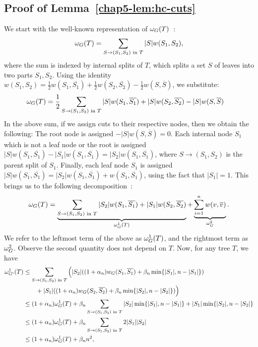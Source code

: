 \subsection{Proof of Lemma~\ref{chap5-lem:hc-cuts}}\label{chap5-app:hc-cuts}
    We start with the well-known representation of $\omega_G(T)$~\citep{dasgupta2016cost}:
    \[
        \omega_G(T) = \sum_{S \rightarrow (S_1, S_2) \text{ in $T$}} |S|w(S_1, S_2),
    \]
    where the sum is indexed by internal splits of $T$, which splits a set $S$ of leaves into two parts $S_1, S_2$. Using the identity $w(S_1, S_2) = \frac{1}{2}w(S_1, \overline{S_1}) + \frac{1}{2}w(S_2, \overline{S_2}) - \frac{1}{2}w(S, \overline{S})$, we substitute:
    \begin{align*}
        \omega_G(T) &= \frac{1}{2}\sum_{S \rightarrow (S_1, S_2) \text{ in $T$}} |S|w(S_1, \overline{S_1}) + |S|w(S_2, \overline{S_2}) - |S|w(S, \overline{S})
    \end{align*}
    In the above sum, if we assign cuts to their respective nodes, then we obtain the following: The root node is assigned $-|S|w(S, \overline{S}) = 0$. Each internal node $S_1$ which is not a leaf node or the root is assigned $|S|w(S_1, \overline{S_1}) - |S_1|w(S_1, \overline{S_1}) = |S_2| w(S_1, \overline{S_1})$, where $S \rightarrow (S_1, S_2)$ is the parent split of $S_1$. Finally, each leaf node $S_1$ is assigned $|S|w(S_1, \overline{S_1}) = |S_2|w(S_1, \overline{S_1}) + w(S_1, \overline{S_1})$, using the fact that $|S_1| = 1$. This brings us to the following decomposition~\citep{agarwal2022sublinear}:
    \[
        \omega_G(T) = \underbrace{\sum_{S \rightarrow (S_1, S_2) \text{ in $T$}}|S_2| w(S_1, \overline{S_1}) + |S_1| w(S_2, \overline{S_2})}_{\omega_G^1(T)} + \underbrace{\sum_{i = 1}^n w(v, \overline{v})}_{\omega_G^2}.
    \]
    We refer to the leftmost term of the above as $\omega_G^1(T)$, and the rightmost term as $\omega_G^2$. Observe the second quantity does not depend on $T$. Now, for any tree $T$, we have
    \begin{align*}
        \omega_{G'}^1(T) &\leq \sum_{S \rightarrow (S_1, S_2) \text{ in $T$}}\Big( |S_2| ((1+\alpha_n)w_{G}(S_1, \overline{S_1}) + \beta_n \min\{|S_1|, n - |S_1|\}) \\ &\qquad + |S_1| ((1+\alpha_n )w_{G}(S_2, \overline{S_2}) + \beta_n \min\{|S_2|, n - |S_2|\})\Big) \\
        &\leq (1+\alpha_n)\omega_{G}^1(T) + \beta_n \sum_{S \rightarrow (S_1, S_2) \text{ in $T$}} |S_2| \min\{|S_1|, n - |S_1|\} + |S_1| \min\{|S_2|, n - |S_2|\} \\
        &\leq (1+\alpha_n)\omega_{G}^1(T) + \beta_n \sum_{S \rightarrow (S_1, S_2) \text{ in $T$}} 2|S_1| |S_2| \\
        &\leq (1+\alpha_n)\omega_{G}^1(T) + \beta_n n^2,
    \end{align*}
